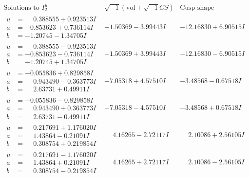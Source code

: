 \documentclass[1p]{elsarticle_modified}
\theoremstyle{definition}
\newcommand{\I}{\sqrt{-1}}
\begin{document}
$$\begin{array}{c|c|c}  
\text{Solutions to }I^u_{2}& \I (\text{vol} + \sqrt{-1}CS) & \text{Cusp shape}\\
 \hline 
\begin{aligned}
u &= \phantom{-}0.388555 + 0.923513 I \\
a &= -0.853623 + 0.736114 I \\
b &= -1.20745 - 1.34705 I\end{aligned}
 & -1.50369 - 3.99443 I & -12.16830 + 6.90515 I \\ \hline\begin{aligned}
u &= \phantom{-}0.388555 - 0.923513 I \\
a &= -0.853623 - 0.736114 I \\
b &= -1.20745 + 1.34705 I\end{aligned}
 & -1.50369 + 3.99443 I & -12.16830 - 6.90515 I \\ \hline\begin{aligned}
u &= -0.055836 + 0.829858 I \\
a &= \phantom{-}0.943490 - 0.363773 I \\
b &= \phantom{-}2.63731 + 0.49911 I\end{aligned}
 & -7.05318 + 4.57510 I & -3.48568 - 0.67518 I \\ \hline\begin{aligned}
u &= -0.055836 - 0.829858 I \\
a &= \phantom{-}0.943490 + 0.363773 I \\
b &= \phantom{-}2.63731 - 0.49911 I\end{aligned}
 & -7.05318 - 4.57510 I & -3.48568 + 0.67518 I \\ \hline\begin{aligned}
u &= \phantom{-}0.217691 + 1.176020 I \\
a &= \phantom{-}1.43864 - 0.21091 I \\
b &= \phantom{-}0.308754 + 0.219854 I\end{aligned}
 & \phantom{-}4.16265 - 2.72117 I & \phantom{-}2.10086 + 2.56105 I \\ \hline\begin{aligned}
u &= \phantom{-}0.217691 - 1.176020 I \\
a &= \phantom{-}1.43864 + 0.21091 I \\
b &= \phantom{-}0.308754 - 0.219854 I\end{aligned}
 & \phantom{-}4.16265 + 2.72117 I & \phantom{-}2.10086 - 2.56105 I \\ \hline\begin{aligned}

\end{aligned}
\end{array}$$
\end{document}
